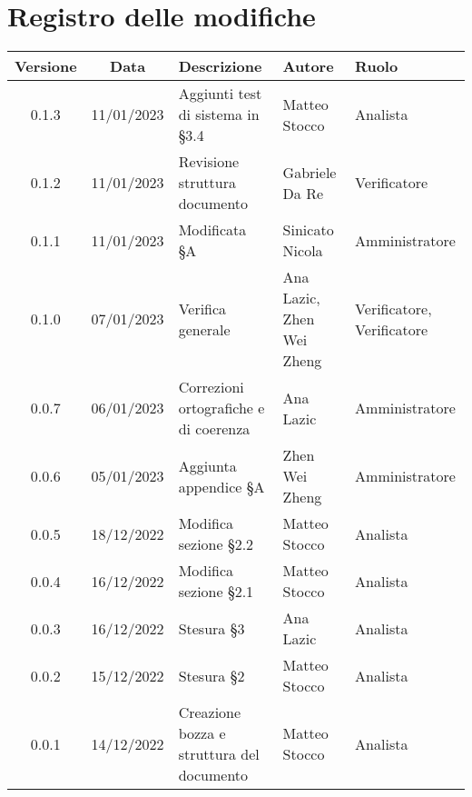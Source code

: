 \section*{Registro delle modifiche}
\begin{center}
\setlength\extrarowheight{5pt}
\renewcommand\tabularxcolumn[1]{>{\Centering}m{#1}}
\begin{tabularx}{\textwidth}{| c | c | X | X | X |} 
	\hline
	\rowcolor{white}
	\textbf{Versione} & \textbf{Data} & \textbf{Descrizione} & \textbf{Autore} & \textbf{Ruolo}\\
    \hline
    0.1.3 & 11/01/2023 & Aggiunti test di sistema in §3.4 & Matteo Stocco & Analista \\
    \hline
	0.1.2 & 11/01/2023 & Revisione struttura documento & Gabriele Da Re & Verificatore \\
	\hline
	0.1.1 & 11/01/2023 & Modificata §A & Sinicato Nicola &Amministratore \\
    \hline
	0.1.0 & 07/01/2023 & Verifica generale & Ana Lazic, Zhen Wei Zheng & Verificatore, Verificatore \\
    \hline
	0.0.7 & 06/01/2023 & Correzioni ortografiche e di coerenza & Ana Lazic & Amministratore \\
	\hline
	0.0.6 & 05/01/2023 & Aggiunta appendice §A & Zhen Wei Zheng & Amministratore \\
	\hline
	0.0.5 & 18/12/2022 & Modifica sezione §2.2 & Matteo Stocco & Analista \\
	\hline
	0.0.4 & 16/12/2022 & Modifica sezione §2.1 & Matteo Stocco & Analista \\
     \hline
	0.0.3 & 16/12/2022 & Stesura §3 & Ana Lazic & Analista \\
	\hline
	0.0.2 & 15/12/2022 & Stesura §2 & Matteo Stocco & Analista \\
	\hline
	0.0.1 & 14/12/2022 & Creazione bozza e struttura del documento & Matteo Stocco & Analista \\
	\hline
	\end{tabularx}
\end{center}
